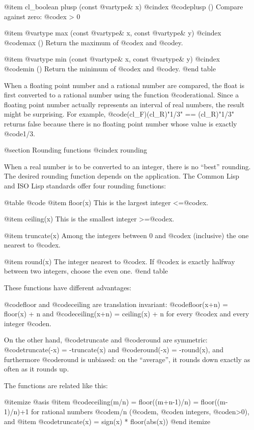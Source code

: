 @item cl_boolean plusp (const @var{type}& x)
@cindex @code{plusp ()}
Compare against zero: @code{x > 0}

@item @var{type} max (const @var{type}& x, const @var{type}& y)
@cindex @code{max ()}
Return the maximum of @code{x} and @code{y}.

@item @var{type} min (const @var{type}& x, const @var{type}& y)
@cindex @code{min ()}
Return the minimum of @code{x} and @code{y}.
@end table

When a floating point number and a rational number are compared, the float
is first converted to a rational number using the function @code{rational}.
Since a floating point number actually represents an interval of real numbers,
the result might be surprising.
For example, @code{(cl_F)(cl_R)"1/3" == (cl_R)"1/3"} returns false because
there is no floating point number whose value is exactly @code{1/3}.


@section Rounding functions
@cindex rounding

When a real number is to be converted to an integer, there is no ``best''
rounding. The desired rounding function depends on the application.
The Common Lisp and ISO Lisp standards offer four rounding functions:

@table @code
@item floor(x)
This is the largest integer <=@code{x}.

@item ceiling(x)
This is the smallest integer >=@code{x}.

@item truncate(x)
Among the integers between 0 and @code{x} (inclusive) the one nearest to @code{x}.

@item round(x)
The integer nearest to @code{x}. If @code{x} is exactly halfway between two
integers, choose the even one.
@end table

These functions have different advantages:

@code{floor} and @code{ceiling} are translation invariant:
@code{floor(x+n) = floor(x) + n} and @code{ceiling(x+n) = ceiling(x) + n}
for every @code{x} and every integer @code{n}.

On the other hand, @code{truncate} and @code{round} are symmetric:
@code{truncate(-x) = -truncate(x)} and @code{round(-x) = -round(x)},
and furthermore @code{round} is unbiased: on the ``average'', it rounds
down exactly as often as it rounds up.

The functions are related like this:

@itemize @asis
@item
@code{ceiling(m/n) = floor((m+n-1)/n) = floor((m-1)/n)+1}
for rational numbers @code{m/n} (@code{m}, @code{n} integers, @code{n}>0), and
@item
@code{truncate(x) = sign(x) * floor(abs(x))}
@end itemize

